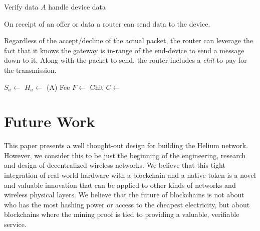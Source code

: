 \documentclass[10pt, nonatbib, nocopyrightspace, reprint]{sigplanconf}
\begin{document}
\begin{description}
\begin{algorithm}[!htb]
       {
        Verify data $A$ \;
        handle device data \;
      }
    \end{algorithm}
    \FloatBarrier


    \item [Send Data] On receipt of an offer or data a router can send data to the device.

      Regardless of the accept/decline of the actual packet, the router can leverage the fact that it knows the gateway is in-range of the end-device to send a message down to it. Along with the packet to send, the router includes a \emph{chit} to pay for the transmission.

    \begin{algorithm}[!htb]
      \DontPrintSemicolon
      \caption{Router Send Data }\label{proto:router.data.send}

       {
        $S_a \leftarrow $  \;
        $H_a \leftarrow $ \Hash(A) \;
        Fee $F \leftarrow $  \;
        Chit $C \leftarrow $  \;
         \;
      }
    \end{algorithm}
    \FloatBarrier

\end{description}

\section{Future Work}

This paper presents a well thought-out design for building the Helium network. However, we consider this to be just the beginning of the engineering, research and design of decentralized wireless networks. We believe that this tight integration of real-world hardware with a blockchain and a native token is a novel and valuable innovation that can be applied to other kinds of networks and wireless physical layers. We believe that the future of blockchains is not about who has the most hashing power or access to the cheapest electricity, but about blockchains where the mining proof is tied to providing a valuable, verifiable service.
\end{document}
